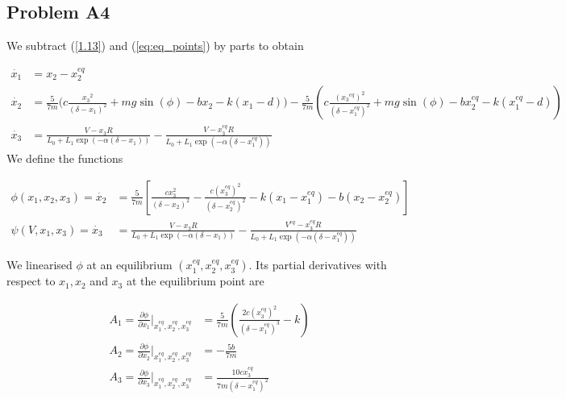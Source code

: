 \documentclass[a4paper,10pt,reqno]{amsart}
\numberwithin{equation}{section}
\begin{document}
\subsection{Problem A4}\label{sec:a4}
We subtract (\ref{1.13}) and (\ref{eq:eq_points}) by parts to obtain

\begin{subequations}
     \begin{align}
          \dot{x_1} &= x_2 - x_2^{eq} \\
          \dot{x_2} &=  \frac{5}{7m}\bigg(c \frac{{x_3}^2}{(\delta - x_1)^2} + mg\sin(\phi) - bx_2 - k(x_1-d)\bigg) - \frac{5}{7m}\left(c \frac{({x_3}^{eq})^2}{(\delta - x_1^{eq})^2} + mg\sin(\phi) - bx_2^{eq} - k(x_1^{eq}-d)\right) \label{eq:x2dot}\\
          \dot{x_3} &= \frac{V - x_3R}{L_0 + L_1\exp(-\alpha(\delta - x_1))} - \frac{V - x_3^{eq}R}{L_0 + L_1\exp(-\alpha(\delta - x_1^{eq}))} \label{eq:x3dot}
     \end{align}
\end{subequations}
We define the functions

\begin{subequations}
    \begin{align}
         \phi(x_1, x_2, x_3) = \dot{x_2} &= \frac{5}{7m}\left[\frac{cx_3^2}{(\delta - x_2)^2} - \frac{c(x_3^{eq})^2}{(\delta - x_2^{eq})^2} - k(x_1 - x_1^{eq}) - b(x_2 - x_2^{eq})\right] \\
         \psi(V, x_1, x_3) = \dot{x_3} &= \frac{V - x_3R}{L_0 + L_1\exp(-\alpha(\delta - x_1))} - \frac{V^{eq} - x_3^{eq}R}{L_0 + L_1\exp(-\alpha(\delta - x_1^{eq}))}
    \end{align}
\end{subequations}

We linearised $\phi$ at an equilibrium $(x_1^{eq}, x_2^{eq}, x_3^{eq})$. Its partial derivatives with respect to $x_1, x_2$ and $x_3$ at the equilibrium point are

\begin{subequations}\label{eq:phiDeriv}
     \begin{align}
          A_1 = \frac{\partial\phi}{\partial x_1}\Bigg|_{x_1^{eq}, x_2^{eq}, x_3^{eq}} &= \frac{5}{7 m}\left(\frac{2 c (x_3^{eq})^{2}}{\left(\delta - x_{1}^{eq}\right)^{3}} - k\right) \\
          A_2 = \frac{\partial\phi}{\partial x_2}\Bigg|_{x_1^{eq}, x_2^{eq}, x_3^{eq}} &= - \frac{5 b}{7 m} \\
          A_3 = \frac{\partial\phi}{\partial x_3}\Bigg|_{x_1^{eq}, x_2^{eq}, x_3^{eq}} &= \frac{10 c x_{3}^{eq}}{7 m \left(\delta - x_{1}^{eq}\right)^{2}}
     \end{align}
\end{subequations}
\end{document}
